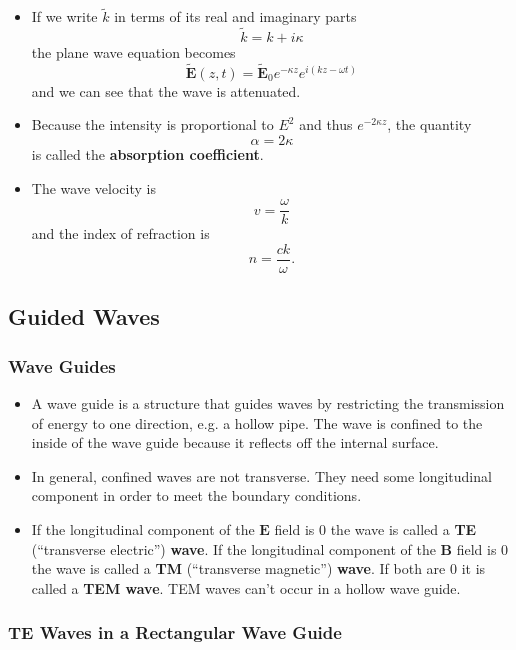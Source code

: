 \documentclass{article}
\renewcommand{\vec}[1]{\boldsymbol{\mathbf{#1}}}
\newcommand{\tvec}[1]{\tilde{\vec{#1}}}
\begin{document}
\begin{itemize}
  \item If we write $\tilde{k}$ in terms of its real and imaginary parts \[\tilde{k} = k + i \kappa\] the plane wave equation becomes \[\tvec{E}(z, t) = \tvec{E}_0 e^{-\kappa z} e^{i (k z - \omega t)}\] and we can see that the wave is attenuated.

  \item Because the intensity is proportional to $E^2$ and thus $e^{-2 \kappa z}$, the quantity \[\alpha = 2 \kappa\] is called the \textbf{absorption coefficient}.

  \item The wave velocity is \[v = \frac{\omega}{k}\] and the index of refraction is \[n = \frac{c k}{\omega}.\]
\end{itemize}

\subsection{Guided Waves}

\subsubsection{Wave Guides}

\begin{itemize}
  \item A wave guide is a structure that guides waves by restricting the transmission of energy to one direction, e.g. a hollow pipe. The wave is confined to the inside of the wave guide because it reflects off the internal surface.

  \item In general, confined waves are not transverse. They need some longitudinal component in order to meet the boundary conditions.

  \item If the longitudinal component of the $\vec{E}$ field is $0$ the wave is called a \textbf{TE} (``transverse electric'') \textbf{wave}. If the longitudinal component of the $\vec{B}$ field is $0$ the wave is called a \textbf{TM} (``transverse magnetic'') \textbf{wave}. If both are $0$ it is called a \textbf{TEM wave}. TEM waves can't occur in a hollow wave guide.
\end{itemize}

\subsubsection{TE Waves in a Rectangular Wave Guide}
\end{document}
